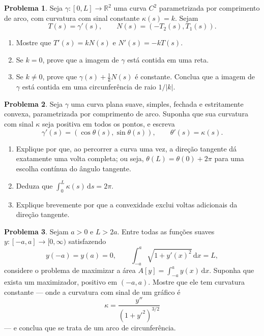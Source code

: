 \documentclass[10pt,a4paper]{amsart}
\newcommand{\R}{\mathbb{R}}
\renewcommand{\d}{\mathrm{d}}
\theoremstyle{definition}
\newtheorem{problema}{Problema}
\begin{document}
\begin{problema}
Seja $\gamma:[0,L]\to\R^2$ uma curva $C^2$ parametrizada por comprimento de
arco, com curvatura com sinal constante $\kappa(s)=k$. Sejam
\[
    T(s)=\gamma'(s),
    \qquad
    N(s)=(-T_2(s),T_1(s)).
\]
\begin{enumerate}[label=(\alph*)]
    \item Mostre que $T'(s)=kN(s)$ e $N'(s)=-kT(s)$.
    \item Se $k=0$, prove que a imagem de $\gamma$ está contida em uma reta.
    \item Se $k\neq 0$, prove que $\gamma(s)+\frac{1}{k}N(s)$ é constante.
    Conclua que a imagem de $\gamma$ está contida em uma circunferência de
    raio $1/|k|$.
\end{enumerate}
\end{problema}

\begin{problema}
Seja $\gamma$ uma curva plana suave, simples, fechada e estritamente
convexa, parametrizada por comprimento de arco. Suponha que sua curvatura
com sinal $\kappa$ seja positiva em todos os pontos, e escreva
\[
    \gamma'(s)=(\cos\theta(s),\sin\theta(s)),
    \qquad
    \theta'(s)=\kappa(s).
\]
\begin{enumerate}[label=(\alph*)]
    \item Explique por que, ao percorrer a curva uma vez, a direção tangente
    dá exatamente uma volta completa; ou seja, $\theta(L)=\theta(0)+2\pi$
    para uma escolha contínua do ângulo tangente.
    \item Deduza que $\int_0^L \kappa(s)\,\d s=2\pi$.
    \item Explique brevemente por que a convexidade exclui voltas adicionais
    da direção tangente.
\end{enumerate}
\end{problema}

\begin{problema}
Sejam $a>0$ e $L>2a$. Entre todas as funções suaves
$y:[-a,a]\to[0,\infty)$ satisfazendo
\[
    y(-a)=y(a)=0,
    \qquad
    \int_{-a}^a \sqrt{1+y'(x)^2}\,\d x=L,
\]
considere o problema de maximizar a área $A[y]=\int_{-a}^a y(x)\,\d x$.
Suponha que exista um maximizador, positivo em $(-a,a)$. Mostre que ele tem
curvatura constante --- onde a curvatura com sinal de um gráfico é
\[
    \kappa=\frac{y''}{(1+y'^2)^{3/2}}
\]
--- e conclua que se trata de um arco de circunferência.
\end{problema}
\end{document}

